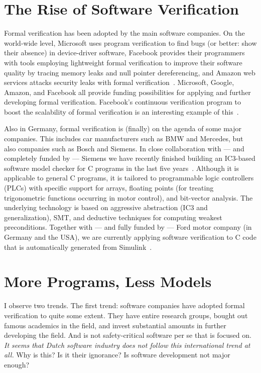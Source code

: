 \documentclass[sigplan,10pt]{acmart}\settopmatter{printfolios=true,printccs=false,printacmref=false}
\begin{document}
\section{The Rise of Software Verification}

Formal verification has been adopted by the main software companies.
On the world-wide level, Microsoft uses program verification to find bugs (or better: show their absence) in device-driver software, Facebook provides their programmers with tools employing lightweight formal verification to improve their software quality by tracing memory leaks and null pointer dereferencing, and Amazon web services attacks security leaks with formal verification~\cite{DBLP:conf/cav/Cook18}.
Microsoft, Google, Amazon, and Facebook all provide funding possibilities for applying and further developing formal verification.
Facebook's continuous verification program to boost the scalability of formal verification is an interesting example of this~\cite{DBLP:conf/lics/OHearn18}.

Also in Germany, formal verification is (finally) on the agenda of some major companies.
This includes car manufacturers such as BMW and Mercedes, but also companies such as Bosch and Siemens.
In close collaboration with --- and completely funded by --- Siemens we have recently finished building an IC3-based software model checker for C programs in the last five years~\cite{DBLP:conf/spin/0001PNNK18}. 
Although it is applicable to general C programs, it is tailored to programmable logic controllers (PLCs) with specific support for arrays, floating points (for treating trigonometric functions occurring in motor control), and bit-vector analysis. 
The underlying technology is based on aggressive abstraction (IC3 and generalization), SMT, and deductive techniques for computing weakest preconditions.
Together with --- and fully funded by --- Ford motor company (in Germany and the USA), we are currently applying software verification to C code that is automatically generated from Simulink~\cite{DBLP:conf/fm/BergerKAWR18}. 

\section{More Programs, Less Models}

I observe two trends.
The first trend: software companies have adopted formal verification to quite some extent.
They have entire research groups, bought out famous academics in the field, and invest substantial amounts in further developing the field.
And is not safety-critical software per se that is focused on.
\emph{It seems that Dutch software industry does not follow this international trend at all.}
Why is this? Is it their ignorance? Is software development not major enough? 
\end{document}
